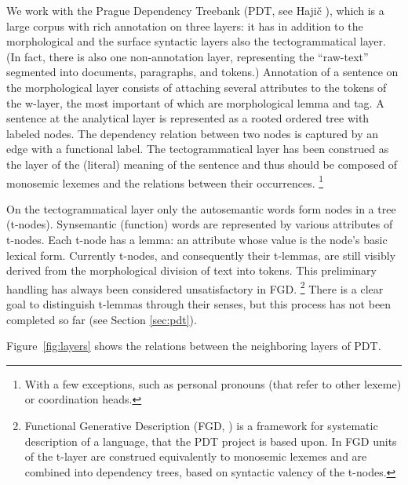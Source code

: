 We work with the Prague Dependency Treebank (PDT, see Hajič \citeyear{hajic:2005}), which is a large corpus with rich annotation on three layers: it has in addition to the morphological and the surface syntactic layers also the tectogrammatical layer.
(In fact, there is also one non-annotation layer, representing the ``raw-text'' segmented into documents, paragraphs, and tokens.)
Annotation of a sentence on the morphological layer consists of attaching several attributes to the tokens of the w-layer, the most important of which are morphological lemma and tag.
A sentence at the analytical layer is represented as a rooted ordered tree with labeled nodes. The dependency relation between two nodes is captured by an edge with a functional label.
The tectogrammatical layer has been construed as the layer of the (literal) meaning of the sentence and thus should be composed of monosemic lexemes and the relations between their occurrences.%
\footnote{With a few exceptions, such as personal pronouns (that refer to other lexeme) or coordination heads.}

On the tectogrammatical layer only the autosemantic words form nodes in a tree (t-nodes). Synsemantic (function) words are represented by various attributes of t-nodes. Each t-node has a lemma: an attribute whose value is the node's basic lexical form.
Currently t-nodes, and consequently their t-lemmas, are still visibly derived from the morphological division of text into tokens. This preliminary handling has always been considered unsatisfactory in FGD.%
\footnote{Functional Generative Description (FGD, \cite{sgall-etal:1986,hajicova:1998}) is a framework for systematic description of a language, that the PDT project is based upon. In FGD units of the t-layer are construed equivalently to monosemic lexemes and are combined into dependency trees, based on syntactic valency of the t-nodes.}
There is a clear goal to distinguish t-lemmas through their senses, but %
this process has not been completed so far (see Section \ref{sec:pdt}).

Figure~\ref{fig:layers} shows the relations between the neighboring layers of PDT. 

